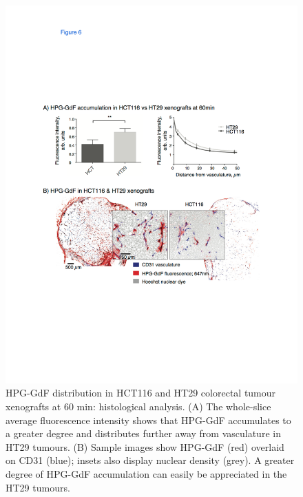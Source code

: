 \begin{figure}[htbp]
 \begin{center}
 \includegraphics[width=\textwidth]{hpg/hpg-paper1-images/hpg_fig6-accumulation.pdf}
 \caption{HPG-GdF distribution in HCT116 and HT29 colorectal tumour xenografts at 60 min: histological analysis.
 (A) The whole-slice average fluorescence intensity shows that \acs{HPG-GdF} accumulates to a greater degree and distributes further away from vasculature in HT29 tumours.
 (B) Sample images show \acs{HPG-GdF} (red) overlaid on \acs{CD31} (blue); insets also display nuclear density (grey).
 A greater degree of \acs{HPG-GdF} accumulation can easily be appreciated in the HT29 tumours.}
 \label{hpgpaper1:fig6}
 \end{center}
\end{figure}

